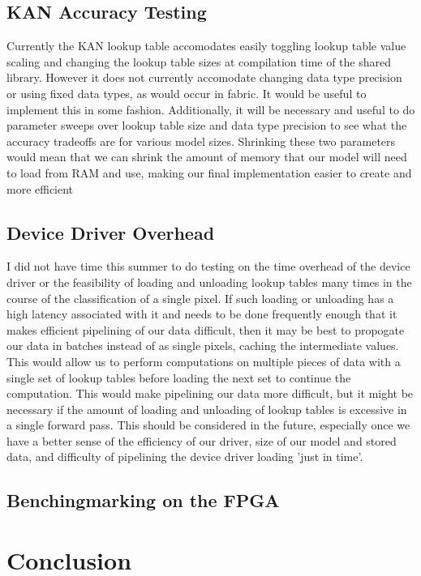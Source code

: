 \documentclass{article}
\begin{document}
\subsection{KAN Accuracy Testing}
Currently the KAN lookup table accomodates easily toggling lookup table value scaling and changing the lookup table sizes at compilation time of the shared library. However it does not currently accomodate changing data type precision or using fixed data types, as would occur in fabric. It would be useful to implement this in some fashion. Additionally, it will be necessary and useful to do parameter sweeps over lookup table size and data type precision to see what the accuracy tradeoffs are for various model sizes. Shrinking these two parameters would mean that we can shrink the amount of memory that our model will need to load from RAM and use, making our final implementation easier to create and more efficient

\subsection{Device Driver Overhead}
I did not have time this summer to do testing on the time overhead of the device driver or the feasibility of loading and unloading lookup tables many times in the course of the classification of a single pixel. If such loading or unloading has a high latency associated with it and needs to be done frequently enough that it makes efficient pipelining of our data difficult, then it may be best to propogate our data in batches instead of as single pixels, caching the intermediate values. This would allow us to perform computations on multiple pieces of data with a single set of lookup tables before loading the next set to continue the computation. This would make pipelining our data more difficult, but it might be necessary if the amount of loading and unloading of lookup tables is excessive in a single forward pass. This should be considered in the future, especially once we have a better sense of the efficiency of our driver, size of our model and stored data, and difficulty of pipelining the device driver loading 'just in time'.

\subsection{Benchingmarking on the FPGA}

\section{Conclusion}
\end{document}
